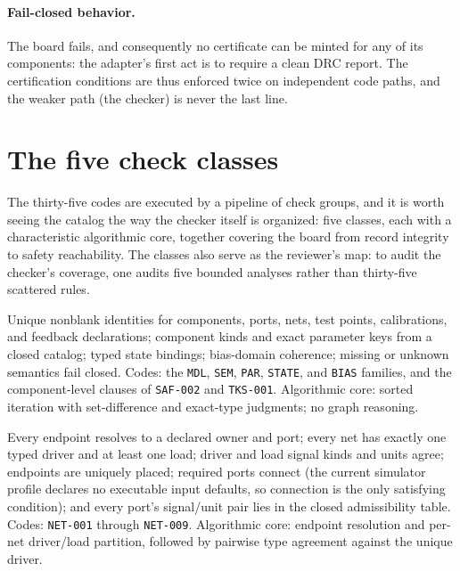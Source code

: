 \paragraph{Fail-closed behavior.} The board fails, and consequently no certificate can be minted for any of its components: the adapter's first act is to require a clean DRC report. The certification conditions are thus enforced twice on independent code paths, and the weaker path (the checker) is never the last line.

\section{The five check classes}\label{ch07:sec:classes}

The thirty-five codes are executed by a pipeline of check groups, and it is worth seeing the catalog the way the checker itself is organized: five classes, each with a characteristic algorithmic core, together covering the board from record integrity to safety reachability. The classes also serve as the reviewer's map: to audit the checker's coverage, one audits five bounded analyses rather than thirty-five scattered rules.

\begin{checkclass}\label{ch07:cc:struct}
Unique nonblank identities for components, ports, nets, test points, calibrations, and feedback declarations; component kinds and exact parameter keys from a closed catalog; typed state bindings; bias-domain coherence; missing or unknown semantics fail closed. Codes: the \texttt{MDL}, \texttt{SEM}, \texttt{PAR}, \texttt{STATE}, and \texttt{BIAS} families, and the component-level clauses of \texttt{SAF-002} and \texttt{TKS-001}. Algorithmic core: sorted iteration with set-difference and exact-type judgments; no graph reasoning.
\end{checkclass}

\begin{checkclass}\label{ch07:cc:net}
Every endpoint resolves to a declared owner and port; every net has exactly one typed driver and at least one load; driver and load signal kinds and units agree; endpoints are uniquely placed; required ports connect (the current simulator profile declares no executable input defaults, so connection is the only satisfying condition); and every port's signal/unit pair lies in the closed admissibility table. Codes: \texttt{NET-001} through \texttt{NET-009}. Algorithmic core: endpoint resolution and per-net driver/load partition, followed by pairwise type agreement against the unique driver.
\end{checkclass}

